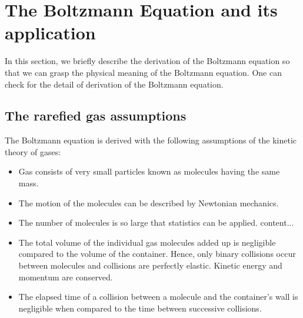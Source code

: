 \documentclass{article}
\begin{document}
\section{The Boltzmann Equation and its application}
In this section, we briefly describe the derivation of the Boltzmann equation so that we can grasp the physical meaning of the Boltzmann equation. One can check \cite{RarefiedGasD, IntroBoltz} for the detail of derivation of the Boltzmann equation.
\subsection{The rarefied gas assumptions}
The Boltzmann equation is derived with the following assumptions of the kinetic theory of gases:
\begin{itemize}
\item Gas consists of very small particles known as molecules having the same mass.
\item The motion of the molecules can be described by Newtonian mechanics.
\item The number of molecules is so large that statistics can be applied.	content...
\item The total volume of the individual gas molecules added up is negligible compared to the volume of the container. Hence, only binary collisions occur between molecules and collisions are perfectly elastic. Kinetic energy and momentum are conserved.
\item The elapsed time of a collision between a molecule and the container's wall is negligible when compared to the time between successive collisions.
\end{itemize}
\end{document}
